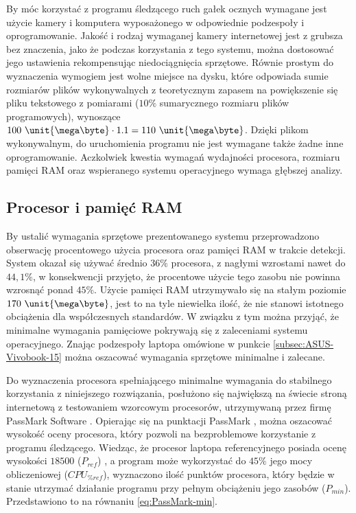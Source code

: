 \documentclass[a4paper,twoside,12pt]{book}
\begin{document}
By móc korzystać z programu śledzącego ruch gałek ocznych wymagane jest użycie kamery i komputera wyposażonego w odpowiednie podzespoły i oprogramowanie. Jakość i rodzaj wymaganej kamery internetowej jest z grubsza bez znaczenia, jako że podczas korzystania z tego systemu, można dostosować jego ustawienia rekompensując niedociągnięcia sprzętowe. Równie prostym do wyznaczenia wymogiem jest wolne miejsce na dysku, które odpowiada sumie rozmiarów plików wykonywalnych z teoretycznym zapasem na powiększenie się pliku tekstowego z pomiarami ($10\%$ sumarycznego rozmiaru plików programowych), wynoszące $100 \ \unit{\mega\byte} \cdot 1.1 = 110 \ \unit{\mega\byte}$. Dzięki plikom wykonywalnym, do uruchomienia programu nie jest wymagane także żadne inne oprogramowanie. Aczkolwiek kwestia wymagań wydajności procesora, rozmiaru pamięci RAM oraz wspieranego systemu operacyjnego wymaga głębszej analizy.

\subsection{Procesor i pamięć RAM}
\label{subsec:Procesor-i-pamięć-RAM}

By ustalić wymagania sprzętowe prezentowanego systemu przeprowadzono obserwację procentowego użycia procesora oraz pamięci RAM w trakcie detekcji. System okazał się używać średnio $36\%$ procesora, z nagłymi wzrostami nawet do $44,1\%$, w konsekwencji przyjęto, że procentowe użycie tego zasobu nie powinna wzrosnąć ponad $45\%$. Użycie pamięci RAM utrzymywało się na stałym poziomie $170 \ \unit{\mega\byte}$, jest to na tyle niewielka ilość, że nie stanowi istotnego obciążenia dla współczesnych standardów. W związku z tym można przyjąć, że minimalne wymagania pamięciowe pokrywają się z zaleceniami systemu operacyjnego. Znając podzespoły laptopa omówione w punkcie \ref{subsec:ASUS-Vivobook-15} można oszacować wymagania sprzętowe minimalne i zalecane.

Do wyznaczenia procesora spełniającego minimalne wymagania do stabilnego korzystania z niniejszego rozwiązania, posłużono się największą na świecie stroną internetową z testowaniem wzorcowym procesorów, utrzymywaną przez firmę PassMark Software \cite{bib:PassMark-about-us}. Opierając się na punktacji PassMark \cite{bib:PassMark-test}, można oszacować wysokość oceny procesora, który pozwoli na bezproblemowe korzystanie z programu śledzącego. Wiedząc, że procesor laptopa referencyjnego posiada ocenę wysokości $18500$ ($P_{ref}$) \cite{bib:moj-procesor-benchmark}, a program może wykorzystać do $45\%$ jego mocy obliczeniowej ($CPU_{\%ref}$), wyznaczono ilość punktów procesora, który będzie w stanie utrzymać działanie programu przy pełnym obciążeniu jego zasobów ($P_{min}$). Przedstawiono to na równaniu \ref{eq:PassMark-min}.
\end{document}
